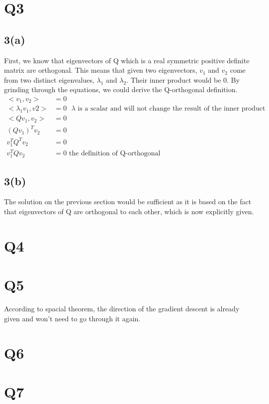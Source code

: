 \documentclass{article}
\begin{document}
\section{Q3}
\subsection*{3(a)}
First, we know that eigenvectors of Q which is a real symmetric positive definite matrix are orthogonal. This means that given two eigenvectors, $v_1$ and $v_2$ come from two distinct eigenvalues, $\lambda_1$ and $\lambda_2$. Their inner product would be 0. By grinding through the equations, we could derive the Q-orthogonal definition.
\begin{equation*}
\begin{aligned}
<v_1, v_2> &= 0\\
<\lambda_1 v_1, v2> &= 0  \mbox{  $\lambda$ is a scalar and will not change the result of the inner product}\\
<Q v_1, v_2> &= 0 \\
(Q v_1)^Tv_2 &= 0 \\
v_1^T Q^Tv_2 &= 0\\
v_1^T Q v_2 &= 0 \mbox{   the definition of Q-orthogonal}
\end{aligned}
\end{equation*}
\subsection*{3(b)}
The solution on the previous section would be sufficient as it is based on the fact that eigenvectors of Q are orthogonal to each other, which is now explicitly given.
\section{Q4}
\section{Q5}
According to spacial theorem, the direction of the gradient descent is already given and won't need to go through it again.
\section{Q6}

\section{Q7}

\end{document}
